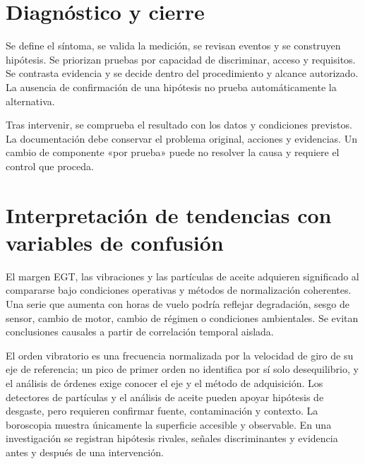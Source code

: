 \section{Diagnóstico y cierre}
Se define el síntoma, se valida la medición, se revisan eventos y se construyen hipótesis. Se priorizan pruebas por capacidad de discriminar, acceso y requisitos. Se contrasta evidencia y se decide dentro del procedimiento y alcance autorizado. La ausencia de confirmación de una hipótesis no prueba automáticamente la alternativa.

Tras intervenir, se comprueba el resultado con los datos y condiciones previstos. La documentación debe conservar el problema original, acciones y evidencias. Un cambio de componente «por prueba» puede no resolver la causa y requiere el control que proceda.
\section{Interpretación de tendencias con variables de confusión}
El margen EGT, las vibraciones y las partículas de aceite adquieren significado al compararse bajo condiciones operativas y métodos de normalización coherentes. Una serie que aumenta con horas de vuelo podría reflejar degradación, sesgo de sensor, cambio de motor, cambio de régimen o condiciones ambientales. Se evitan conclusiones causales a partir de correlación temporal aislada.

El orden vibratorio es una frecuencia normalizada por la velocidad de giro de su eje de referencia; un pico de primer orden no identifica por sí solo desequilibrio, y el análisis de órdenes exige conocer el eje y el método de adquisición. Los detectores de partículas y el análisis de aceite pueden apoyar hipótesis de desgaste, pero requieren confirmar fuente, contaminación y contexto. La boroscopia muestra únicamente la superficie accesible y observable. En una investigación se registran hipótesis rivales, señales discriminantes y evidencia antes y después de una intervención.


